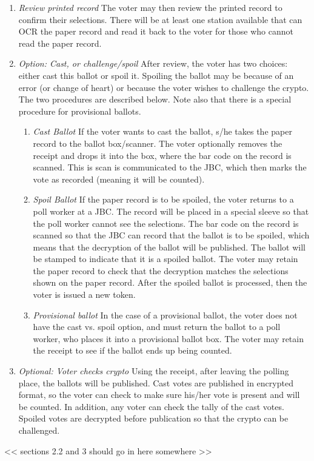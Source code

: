 \begin{enumerate}
\item {\em Review printed record}
The voter may then review the printed record to confirm their selections. There will be at least one station available that can OCR the paper record and read it back to the voter for those who cannot read the paper record.

\item {\em Option: Cast, or challenge/spoil}
After review, the voter has two choices: either cast this ballot or spoil it. Spoiling the ballot may be because of an error (or change of heart) or because the voter wishes to challenge the crypto. The two procedures are described below. Note also that there is a special procedure for provisional ballots.

\begin{enumerate}
\item  {\em Cast Ballot}
If the voter wants to cast the ballot, s/he takes the paper record to the ballot box/scanner. The voter optionally removes the receipt and drops it into the box, where the bar code on the record is scanned. This is scan is communicated to the JBC, which then marks the vote as recorded (meaning it will be counted).

\item {\em Spoil Ballot}
If the paper record is to be spoiled, the voter returns to a poll worker at a JBC. The record will be placed in a special sleeve so that the poll worker cannot see the selections. The bar code on the record is scanned so that the JBC can record that the ballot is to be spoiled, which means that the decryption of the ballot will be published. The ballot will be stamped to indicate that it is a spoiled ballot. The voter may retain the paper record to check that the decryption matches the selections shown on the paper record. After the spoiled ballot is processed, then the voter is issued a new token.

\item {\em Provisional ballot}
In the case of a provisional ballot, the voter does not have the cast vs. spoil option, and must return the ballot to a poll worker, who places it into a provisional ballot box. The voter may retain the receipt to see if the ballot ends up being counted.
\end{enumerate}

\item {\em Optional: Voter checks crypto}
Using the receipt, after leaving the polling place, the ballots will be published. Cast votes are published in encrypted format, so the voter can check to make sure his/her vote is present and will be counted. In addition, any voter can check the tally of the cast votes. Spoiled votes are decrypted before publication so that the crypto can be challenged.
\end{enumerate}

<< sections 2.2 and 3 should go in here somewhere >>


